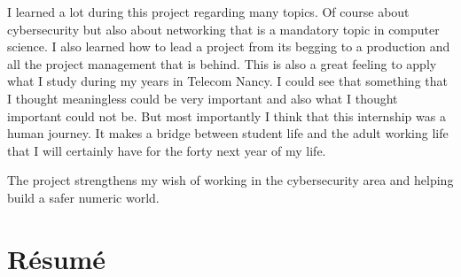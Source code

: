\documentclass{tnreport}
\begin{document}
I learned a lot during this project regarding many topics. Of course about cybersecurity but also about networking that is a mandatory topic in computer science. I also learned how to lead a project from its begging to a production and all the project management that is behind. This is also a great feeling to apply what I study during my years in Telecom Nancy. I could see that something that I thought meaningless could be very important and also what I thought important could not be. But most importantly I think that this internship was a human journey. It makes a bridge between student life and the adult working life that I will certainly have for the forty next year of my life. 

The project strengthens my wish of working in the cybersecurity area and helping build a safer numeric  world. 



\cleardoublepage
\renewcommand{\tocbibname}{Bibliographie / Webographie}


\cleardoublepage

\listoffigures
\cleardoublepage

\listoftables
\cleardoublepage


\printglossaries

\cleardoublepage
\renewcommand{\thesubsection}{\Roman{subsection}}

\appendix



\thispagestyle{empty}

\section*{Résumé}
\end{document}

